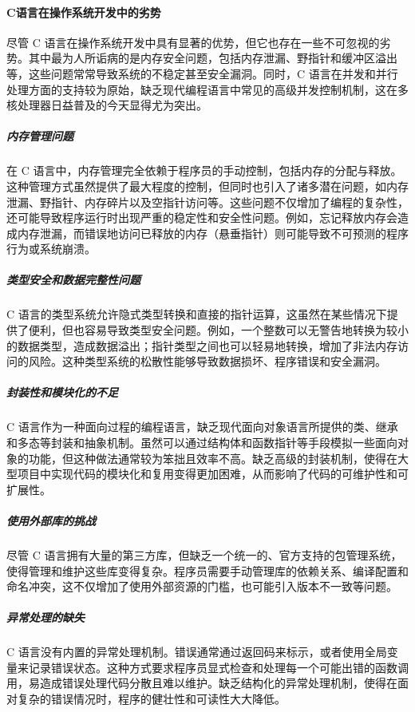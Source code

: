 \paragraph{C语言在操作系统开发中的劣势}

尽管 C 语言在操作系统开发中具有显著的优势，但它也存在一些不可忽视的劣势。其中最为人所诟病的是内存安全问题，包括内存泄漏、野指针和缓冲区溢出等，这些问题常常导致系统的不稳定甚至安全漏洞。同时，C 语言在并发和并行处理方面的支持较为原始，缺乏现代编程语言中常见的高级并发控制机制，这在多核处理器日益普及的今天显得尤为突出。

\subparagraph{内存管理问题}

在 C 语言中，内存管理完全依赖于程序员的手动控制，包括内存的分配与释放。这种管理方式虽然提供了最大程度的控制，但同时也引入了诸多潜在问题，如内存泄漏、野指针、内存碎片以及空指针访问等。这些问题不仅增加了编程的复杂性，还可能导致程序运行时出现严重的稳定性和安全性问题。例如，忘记释放内存会造成内存泄漏，而错误地访问已释放的内存（悬垂指针）则可能导致不可预测的程序行为或系统崩溃。

\subparagraph{类型安全和数据完整性问题}

C 语言的类型系统允许隐式类型转换和直接的指针运算，这虽然在某些情况下提供了便利，但也容易导致类型安全问题。例如，一个整数可以无警告地转换为较小的数据类型，造成数据溢出；指针类型之间也可以轻易地转换，增加了非法内存访问的风险。这种类型系统的松散性能够导致数据损坏、程序错误和安全漏洞。

\subparagraph{封装性和模块化的不足}

C 语言作为一种面向过程的编程语言，缺乏现代面向对象语言所提供的类、继承和多态等封装和抽象机制。虽然可以通过结构体和函数指针等手段模拟一些面向对象的功能，但这种做法通常较为笨拙且效率不高。缺乏高级的封装机制，使得在大型项目中实现代码的模块化和复用变得更加困难，从而影响了代码的可维护性和可扩展性。

\subparagraph{使用外部库的挑战}

尽管 C 语言拥有大量的第三方库，但缺乏一个统一的、官方支持的包管理系统，使得管理和维护这些库变得复杂。程序员需要手动管理库的依赖关系、编译配置和命名冲突，这不仅增加了使用外部资源的门槛，也可能引入版本不一致等问题。

\subparagraph{异常处理的缺失}

C 语言没有内置的异常处理机制。错误通常通过返回码来标示，或者使用全局变量来记录错误状态。这种方式要求程序员显式检查和处理每一个可能出错的函数调用，易造成错误处理代码分散且难以维护。缺乏结构化的异常处理机制，使得在面对复杂的错误情况时，程序的健壮性和可读性大大降低。

